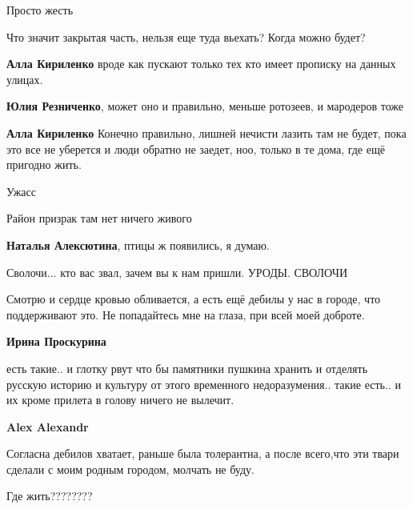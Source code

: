  
 
 
 
 
\qqSecCmt

\begin{itemize} %
Просто жесть

Что значит закрытая часть, нельзя еще туда вьехать? Когда можно будет?

\begin{itemize} %
\textbf{Алла Кириленко} вроде как пускают только тех кто имеет прописку на данных улицах.

\textbf{Юлия Резниченко}, может оно и правильно, меньше ротозеев, и мародеров тоже

\textbf{Алла Кириленко} Конечно правильно, лишней нечисти лазить там не будет, пока это все не уберется и люди обратно не заедет, ноо, только в те дома, где ещё пригодно жить.
\end{itemize} %

Ужасс

Район призрак там нет ничего живого

\textbf{Наталья Алексютина}, птицы ж появились, я думаю.

Сволочи... кто вас звал, зачем вы к нам пришли. УРОДЫ. СВОЛОЧИ


Смотрю и сердце кровью обливается, а есть ещё дебилы у нас в городе, что
поддерживают это. Не попадайтесь мне на глаза, при всей моей доброте.

\begin{itemize} %
\textbf{Ирина Проскурина} 

есть такие.. и глотку рвут что бы памятники пушкина хранить и отделять русскую
историю и культуру от этого временного недоразумения.. такие есть.. и их кроме
прилета в голову ничего не вылечит.

\textbf{Alex Alexandr} 

Согласна дебилов хватает, раньше была толерантна, а после всего,что эти твари
сделали с моим родным городом, молчать не буду.

\end{itemize} %

Где жить????????

\end{itemize} %
